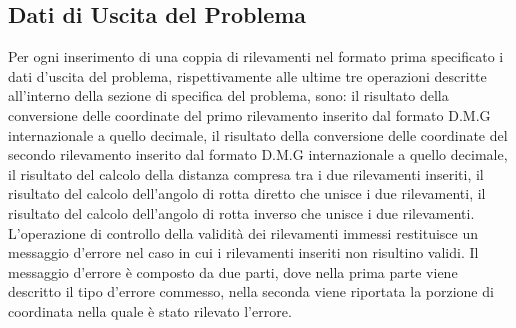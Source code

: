 \documentclass{article}
\begin{document}
\subsection{Dati di Uscita del Problema}
Per ogni inserimento di una coppia di rilevamenti nel formato prima specificato i dati d'uscita del problema, rispettivamente alle ultime tre operazioni descritte all'interno della sezione di specifica del problema, sono: il risultato della conversione delle coordinate del primo rilevamento inserito dal formato D.M.G internazionale a quello decimale, il risultato della conversione delle coordinate del secondo rilevamento inserito dal formato D.M.G internazionale a quello decimale, il risultato del calcolo della distanza compresa tra i due rilevamenti inseriti, il risultato del calcolo dell'angolo di rotta diretto che unisce i due rilevamenti, il risultato del calcolo dell'angolo di rotta inverso che unisce i due rilevamenti.\\ 
L'operazione di controllo della validità dei rilevamenti immessi restituisce un messaggio d'errore nel caso in cui i rilevamenti inseriti non risultino validi. Il messaggio d'errore è composto da due parti, dove nella prima parte viene descritto il tipo d'errore commesso, nella seconda viene riportata la porzione di coordinata nella quale è stato rilevato l'errore. 
\end{document}
